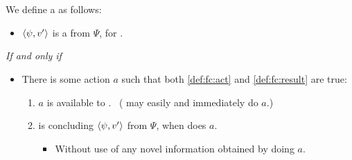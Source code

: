 \section{}
\label{cha:fcs:def}

\begin{note}[\fc{2} definition]
  We define a \emph{} as follows:

  \begin{definition}[\fc{3}]
    \label{def:fc}

    \begin{itemize}
    \item
      \(\langle \psi, v' \rangle\) is a \emph{} from \(\Psi\), for \vAgent{}.
    \end{itemize}

    \emph{If and only if}

    \begin{itemize}
    \item
      There is some action \(a\) such that both \ref{def:fc:act} and \ref{def:fc:result} are true:
      \begin{enumerate}[label=\alph*., ref=(\alph*), series=fcCounter]
      \item
        \label{def:fc:act}
        \(a\) is available to \vAgent{}.
        \mbox{ }\hfill (\vAgent{} may easily and immediately do \(a\).)
      \item
        \label{def:fc:result}
        \vAgent{} is concluding \(\langle \psi, v' \rangle\) from \(\Psi\), when \vAgent{} does \(a\).
        \begin{itemize}
        \item
          Without use of any novel information obtained by doing \(a\).
        \end{itemize}
      \end{enumerate}
    \end{itemize}
    \vspace{-\baselineskip}
  \end{definition}


\end{note}
